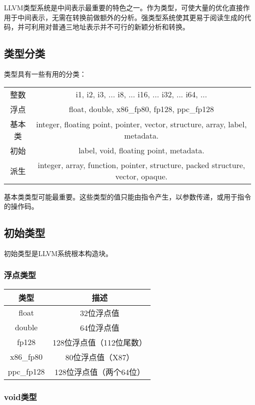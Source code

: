 \documentclass[12pt,a4paper]{article}
\begin{document}
{LLVM类型系统是中间表示最重要的特色之一。作为类型，可使大量的优化直接作用于中间表示，无需在转换前做额外的分析。强类型系统使其更易于阅读生成的代码，并可利用对普通三地址表示并不可行的新颖分析和转换。

\subsection{类型分类}

类型具有一些有用的分类：

\begin{tabular}{|c|c|}
\hline
整数 & i1, i2, i3, ... i8, ... i16, ... i32, ... i64, ... \\
浮点 & float, double, x86\_fp80, fp128, ppc\_fp128 \\
基本类 & integer, floating point, pointer, vector, structure, array, label, metadata. \\
初始 & label, void, floating point, metadata. \\
派生 & integer, array, function, pointer, structure, packed structure, vector, opaque. \\
\hline
\end{tabular}

基本类类型可能最重要。这些类型的值只能由指令产生，以参数传递，或用于指令的操作码。

\subsection{初始类型}

初始类型是LLVM系统根本构造块。

\subsubsection{浮点类型}

\begin{tabular}{|c|c|}
\hline
类型 & 描述 \\ \hline
float & 32位浮点值 \\ \hline
double & 64位浮点值 \\ \hline
fp128 & 128位浮点值（112位尾数） \\ \hline
x86\_fp80 & 80位浮点值（X87） \\ \hline
ppc\_fp128 & 128位浮点值（两个64位） \\ \hline
\end{tabular}

\subsubsection{void类型}

}
\end{document}
